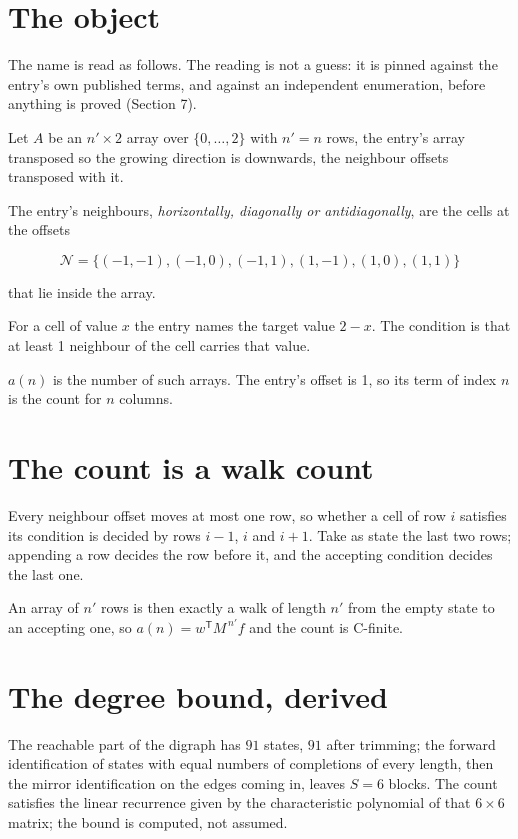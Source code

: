 \documentclass[11pt]{article}
\theoremstyle{definition}
\begin{document}
\section{The object}

The name is read as follows. The reading is not a guess: it is pinned against the entry's own published terms, and against an independent enumeration, before anything is proved (Section 7).

Let $A$ be an $n' \times 2$ array over $\{0,\dots,2\}$ with $n' = n$ rows, the entry's array transposed so the growing direction is downwards, the neighbour offsets transposed with it.

The entry's neighbours, {\itshape horizontally, diagonally or antidiagonally}, are the cells at the offsets

\[\mathcal{N} = \{(-1,-1), (-1,0), (-1,1), (1,-1), (1,0), (1,1)\}\]

that lie inside the array.

For a cell of value $x$ the entry names the target value $2 - x$. The condition is that at least 1 neighbour of the cell carries that value.

$a(n)$ is the number of such arrays. The entry's offset is 1, so its term of index $n$ is the count for $n$ columns.

\section{The count is a walk count}

Every neighbour offset moves at most one row, so whether a cell of row $i$ satisfies its condition is decided by rows $i-1$, $i$ and $i+1$. Take as state the last two rows; appending a row decides the row before it, and the accepting condition decides the last one.

An array of $n'$ rows is then exactly a walk of length $n'$ from the empty state to an accepting one, so $a(n) = w^{\mathsf T}M^{\,n'}f$ and the count is C-finite.

\section{The degree bound, derived}

The reachable part of the digraph has $91$ states, $91$ after trimming; the forward identification of states with equal numbers of completions of every length, then the mirror identification on the edges coming in, leaves $S = 6$ blocks. The count satisfies the linear recurrence given by the characteristic polynomial of that $6\times6$ matrix; the bound is computed, not assumed.
\end{document}
